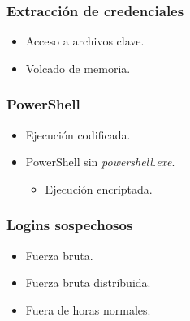 \documentclass[a4paper,10pt]{beamer}
\begin{document}
\begin{frame}[fragile]
	\frametitle{Extracción de credenciales}

	\begin{itemize}
		\item Acceso a archivos clave.
		\item Volcado de memoria.
	\end{itemize}
\end{frame}



\begin{frame}[fragile]
	\frametitle{PowerShell}

	\begin{itemize}
		\item Ejecución codificada. %
		\item PowerShell sin \textit{powershell.exe}. %
		\begin{itemize}
			\item Ejecución encriptada. %
		\end{itemize}
	\end{itemize}
\end{frame}

\begin{frame}[fragile]
	\frametitle{Logins sospechosos} %

	\begin{itemize}
		\item Fuerza bruta. 				%
		\item Fuerza bruta distribuida. 	%
		\item Fuera de horas normales. 		%
	\end{itemize}
\end{frame}
\end{document}
